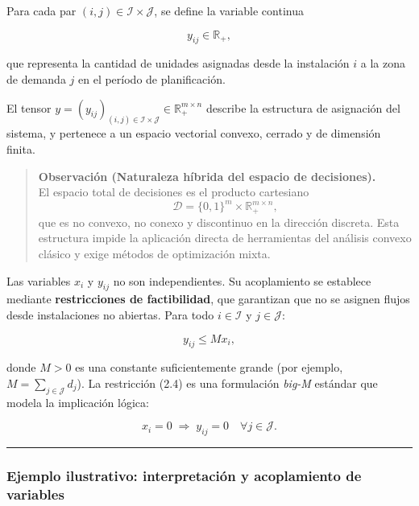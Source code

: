 \documentclass[
  spanish,
  letterpaper,
  DIV=11,
  numbers=noendperiod]{scrartcl}
\begin{document}
Para cada par \((i,j) \in \mathcal{I} \times \mathcal{J}\), se define la
variable continua

\[
y_{ij} \in \mathbb{R}_+,
\]

que representa la cantidad de unidades asignadas desde la instalación
\(i\) a la zona de demanda \(j\) en el período de planificación.

El tensor
\(y = (y_{ij})_{(i,j) \in \mathcal{I} \times \mathcal{J}} \in \mathbb{R}_+^{m \times n}\)
describe la estructura de asignación del sistema, y pertenece a un
espacio vectorial convexo, cerrado y de dimensión finita.

\begin{quote}
\textbf{Observación (Naturaleza híbrida del espacio de decisiones).}\\
El espacio total de decisiones es el producto cartesiano\\
\[
\mathcal{D} = \{0,1\}^m \times \mathbb{R}_+^{m \times n},
\] que es no convexo, no conexo y discontinuo en la dirección discreta.
Esta estructura impide la aplicación directa de herramientas del
análisis convexo clásico y exige métodos de optimización mixta.
\end{quote}

Las variables \(x_i\) y \(y_{ij}\) no son independientes. Su
acoplamiento se establece mediante \textbf{restricciones de
factibilidad}, que garantizan que no se asignen flujos desde
instalaciones no abiertas. Para todo \(i \in \mathcal{I}\) y
\(j \in \mathcal{J}\):

\[
y_{ij} \le M x_i, \tag{2.4}
\]

donde \(M > 0\) es una constante suficientemente grande (por ejemplo,
\(M = \sum_{j \in \mathcal{J}} d_j\)). La restricción (2.4) es una
formulación \emph{big-M} estándar que modela la implicación lógica:

\[
x_i = 0 \;\Rightarrow\; y_{ij} = 0 \quad \forall j \in \mathcal{J}.
\]

\begin{center}\rule{0.5\linewidth}{0.5pt}\end{center}

\subsubsection{\texorpdfstring{\textbf{Ejemplo ilustrativo:
interpretación y acoplamiento de
variables}}{Ejemplo ilustrativo: interpretación y acoplamiento de variables}}\label{ejemplo-ilustrativo-interpretaciuxf3n-y-acoplamiento-de-variables}
\end{document}
